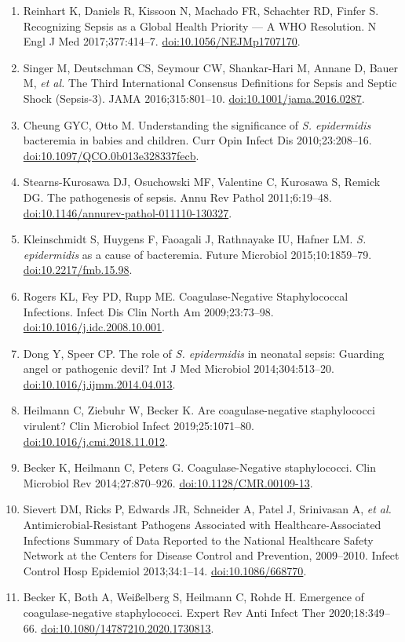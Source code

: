 \documentclass[
]{book}
\providecommand{\tightlist}{%
  \setlength{\itemsep}{0pt}\setlength{\parskip}{0pt}}
\begin{document}
\begin{enumerate}
\def\labelenumi{\arabic{enumi}.}
\tightlist
\item
  Reinhart K, Daniels R, Kissoon N, Machado FR, Schachter RD, Finfer S. Recognizing Sepsis as a Global Health Priority --- A WHO Resolution. N Engl J Med 2017;377:414--7. \url{doi:10.1056/NEJMp1707170}.
\item
  Singer M, Deutschman CS, Seymour CW, Shankar-Hari M, Annane D, Bauer M, \emph{et al.} The Third International Consensus Definitions for Sepsis and Septic Shock (Sepsis-3). JAMA 2016;315:801--10. \url{doi:10.1001/jama.2016.0287}.
\item
  Cheung GYC, Otto M. Understanding the significance of \emph{S. epidermidis} bacteremia in babies and children. Curr Opin Infect Dis 2010;23:208--16. \url{doi:10.1097/QCO.0b013e328337fecb}.
\item
  Stearns-Kurosawa DJ, Osuchowski MF, Valentine C, Kurosawa S, Remick DG. The pathogenesis of sepsis. Annu Rev Pathol 2011;6:19--48. \url{doi:10.1146/annurev-pathol-011110-130327}.
\item
  Kleinschmidt S, Huygens F, Faoagali J, Rathnayake IU, Hafner LM. \emph{S. epidermidis} as a cause of bacteremia. Future Microbiol 2015;10:1859--79. \url{doi:10.2217/fmb.15.98}.
\item
  Rogers KL, Fey PD, Rupp ME. Coagulase-Negative Staphylococcal Infections. Infect Dis Clin North Am 2009;23:73--98. \url{doi:10.1016/j.idc.2008.10.001}.
\item
  Dong Y, Speer CP. The role of \emph{S. epidermidis} in neonatal sepsis: Guarding angel or pathogenic devil? Int J Med Microbiol 2014;304:513--20. \url{doi:10.1016/j.ijmm.2014.04.013}.
\item
  Heilmann C, Ziebuhr W, Becker K. Are coagulase-negative staphylococci virulent? Clin Microbiol Infect 2019;25:1071--80. \url{doi:10.1016/j.cmi.2018.11.012}.
\item
  Becker K, Heilmann C, Peters G. Coagulase-Negative staphylococci. Clin Microbiol Rev 2014;27:870--926. \url{doi:10.1128/CMR.00109-13}.
\item
  Sievert DM, Ricks P, Edwards JR, Schneider A, Patel J, Srinivasan A, \emph{et al.} Antimicrobial-Resistant Pathogens Associated with Healthcare-Associated Infections Summary of Data Reported to the National Healthcare Safety Network at the Centers for Disease Control and Prevention, 2009--2010. Infect Control Hosp Epidemiol 2013;34:1--14. \url{doi:10.1086/668770}.
\item
  Becker K, Both A, Weißelberg S, Heilmann C, Rohde H. Emergence of coagulase-negative staphylococci. Expert Rev Anti Infect Ther 2020;18:349--66. \url{doi:10.1080/14787210.2020.1730813}.

\end{enumerate}
\end{document}
